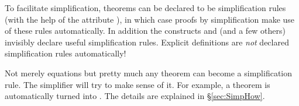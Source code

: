 %
\begin{isabellebody}%
\def\isabellecontext{simp}%
%
%
\begin{isamarkuptext}%
To facilitate simplification, theorems can be declared to be simplification
rules (with the help of the attribute ), in which case proofs by simplification make use of these
rules automatically. In addition the constructs  and
 (and a few others) invisibly declare useful
simplification rules. Explicit definitions are \emph{not} declared
simplification rules automatically!

Not merely equations but pretty much any theorem can become a simplification
rule. The simplifier will try to make sense of it.  For example, a theorem
 is automatically turned into . The details
are explained in \S\ref{sec:SimpHow}.


\end{isamarkuptext}
\end{isabellebody}
